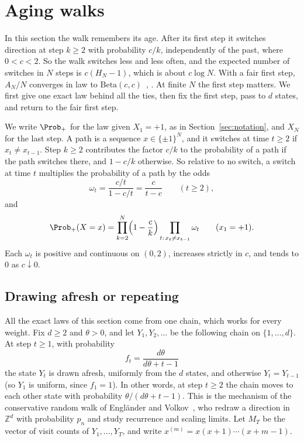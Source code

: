\section{Aging walks}\label{sec:aging}

In this section the walk remembers its age. After its first step it switches
direction at step $k\ge2$ with probability $c/k$, independently of the past,
where $0<c<2$. So the walk switches less and less often, and the expected
number of switches in $N$ steps is $c(H_N-1)$, which is about $c\log N$. With
a fair first step, $A_N/N$ converges in law to
$\mathrm{Beta}(c,c)$~\cite[Example~1.1 and Theorem~1.4]{ds2007},
\cite[Theorem~1]{ev2018}. At finite $N$ the first step
matters. We first give one exact law behind all the ties, then fix the first
step, pass to $d$ states, and return to the fair first step.

We write $\Prob_+$ for the law given $X_1=+1$, as in
Section~\ref{sec:notation}, and $X_N$ for the last step. A path is a sequence
$x\in\{\pm1\}^N$, and it switches at time $t\ge2$ if $x_t\ne x_{t-1}$. Step
$k\ge2$ contributes the factor $c/k$ to the probability of a path if the path
switches there, and $1-c/k$ otherwise. So relative to no switch, a switch at
time $t$ multiplies the probability of a path by the odds
\[
 \omega_t=\frac{c/t}{1-c/t}=\frac{c}{t-c}\qquad(t\ge2),
\]
and
\begin{equation}\label{eq:aging-path}
 \Prob_+(X=x)=\prod_{k=2}^N\Bigl(1-\frac ck\Bigr)\prod_{t:\,x_t\ne x_{t-1}}\omega_t
 \qquad(x_1=+1).
\end{equation}
Each $\omega_t$ is positive and continuous on $(0,2)$, increases strictly in
$c$, and tends to $0$ as $c\downarrow0$.

\subsection{Drawing afresh or repeating}\label{sec:aging-urn}

All the exact laws of this section come from one chain, which works for every
weight. Fix $d\ge2$ and $\theta>0$, and let $Y_1,Y_2,\dots$ be the following
chain on $\{1,\dots,d\}$. At step $t\ge1$, with probability
\[
 f_t=\frac{d\theta}{d\theta+t-1}
\]
the state $Y_t$ is drawn afresh, uniformly from the $d$ states, and otherwise
$Y_t=Y_{t-1}$ (so $Y_1$ is uniform, since $f_1=1$). In other words, at
step $t\ge2$ the chain moves to each other state with probability
$\theta/(d\theta+t-1)$. This is the mechanism of the conservative random walk
of Engl\"ander and Volkov~\cite{ev2022}, who redraw a direction in
$\mathbb Z^d$ with probability $p_n$ and study recurrence and scaling limits.
Let $M_T$ be the vector of visit counts of $Y_1,\dots,Y_T$, and write
$x^{(m)}=x(x+1)\cdots(x+m-1)$.

